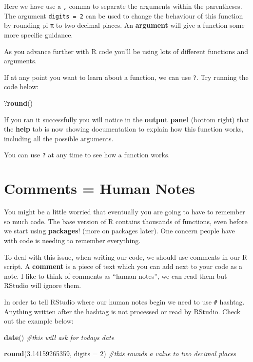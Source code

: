 \documentclass[
]{book}
\newenvironment{Shaded}{\begin{snugshade}}{\end{snugshade}}
\newcommand{\AttributeTok}[1]{\textcolor[rgb]{0.13,0.29,0.53}{#1}}
\newcommand{\CommentTok}[1]{\textcolor[rgb]{0.56,0.35,0.01}{\textit{#1}}}
\newcommand{\DecValTok}[1]{\textcolor[rgb]{0.00,0.00,0.81}{#1}}
\newcommand{\FloatTok}[1]{\textcolor[rgb]{0.00,0.00,0.81}{#1}}
\newcommand{\FunctionTok}[1]{\textcolor[rgb]{0.13,0.29,0.53}{\textbf{#1}}}
\newcommand{\NormalTok}[1]{#1}
\let\oldsection\section
\renewcommand{\section}{\needspace{5\baselineskip}\oldsection}
\begin{document}
Here we have use a \texttt{,} comma to separate the arguments within the parentheses. The argument \texttt{digits\ =\ 2} can be used to change the behaviour of this function by rounding pi \texttt{π} to two decimal places. An \textbf{argument} will give a function some more specific guidance.

As you advance further with R code you'll be using lots of different functions and arguments.

If at any point you want to learn about a function, we can use \texttt{?}. Try running the code below:

\begin{Shaded}
\begin{Highlighting}[]
\NormalTok{?}\FunctionTok{round}\NormalTok{()}
\end{Highlighting}
\end{Shaded}

If you ran it successfully you will notice in the \textbf{output panel} (bottom right) that the \textbf{help} tab is now showing documentation to explain how this function works, including all the possible arguments.

You can use \texttt{?} at any time to see how a function works.

\section{Comments = Human Notes}\label{comments-human-notes}

You might be a little worried that eventually you are going to have to remember so much code. The base version of R contains thousands of functions, even before we start using \textbf{packages}! (more on packages later). One concern people have with code is needing to remember everything.

To deal with this issue, when writing our code, we should use comments in our R script. A \textbf{comment} is a piece of text which you can add next to your code as a note. I like to think of comments as ``human notes'', we can read them but RStudio will ignore them.

In order to tell RStudio where our human notes begin we need to use \texttt{\#} hashtag. Anything written after the hashtag is not processed or read by RStudio. Check out the example below:

\begin{Shaded}
\begin{Highlighting}[]
\FunctionTok{date}\NormalTok{() }\CommentTok{\#this will ask for today\textquotesingle{}s date}

\FunctionTok{round}\NormalTok{(}\FloatTok{3.14159265359}\NormalTok{, }\AttributeTok{digits =} \DecValTok{2}\NormalTok{) }\CommentTok{\#this rounds a value to two decimal places}
\end{Highlighting}
\end{Shaded}
\end{document}
